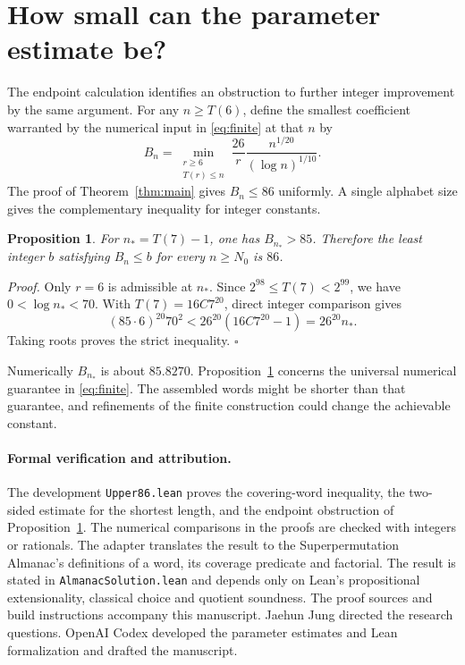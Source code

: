 \documentclass[11pt]{article}
\newtheorem{proposition}[theorem]{Proposition}
\newenvironment{proof}{\par\noindent\textit{Proof.}\enspace}{\unskip\nobreak\hfill\ensuremath{\square}\par}
\begin{document}
\section{How small can the parameter estimate be?}
The endpoint calculation identifies an obstruction to further integer improvement by the same argument. For any \(n\ge T(6)\), define the smallest coefficient warranted by the numerical input in \eqref{eq:finite} at that \(n\) by
\[
       B_n=\min_{\substack{r\ge6\\T(r)\le n}}
         \frac{26}{r}\frac{n^{1/20}}{(\log n)^{1/10}} .
\]
The proof of Theorem~\ref{thm:main} gives \(B_n\le86\) uniformly. A single alphabet size gives the complementary inequality for integer constants.

\begin{proposition}\label{prop:85}
For \(n_*=T(7)-1\), one has \(B_{n_*}>85\). Therefore the least integer \(b\) satisfying \(B_n\le b\) for every \(n\ge N_0\) is \(86\).
\end{proposition}

\begin{proof}
Only \(r=6\) is admissible at \(n_*\). Since \(2^{98}\le T(7)<2^{99}\), we have \(0<\log n_*<70\). With \(T(7)=16C7^{20}\), direct integer comparison gives
\[
            (85\cdot6)^{20}70^2
                    <26^{20}(16C7^{20}-1)=26^{20}n_* .
\]
Taking roots proves the strict inequality. \end{proof}

Numerically \(B_{n_*}\) is about \(85.8270\). Proposition~\ref{prop:85} concerns the universal numerical guarantee in \eqref{eq:finite}. The assembled words might be shorter than that guarantee, and refinements of the finite construction could change the achievable constant.

\paragraph{Formal verification and attribution.}
The development \texttt{Upper86.lean} proves the covering-word inequality, the two-sided estimate for the shortest length, and the endpoint obstruction of Proposition~\ref{prop:85}. The numerical comparisons in the proofs are checked with integers or rationals. The adapter translates the result to the Superpermutation Almanac's definitions of a word, its coverage predicate and factorial. The result is stated in \texttt{AlmanacSolution.lean} and depends only on Lean's propositional extensionality, classical choice and quotient soundness. The proof sources and build instructions accompany this manuscript. Jaehun Jung directed the research questions. OpenAI Codex developed the parameter estimates and Lean formalization and drafted the manuscript.
\end{document}

